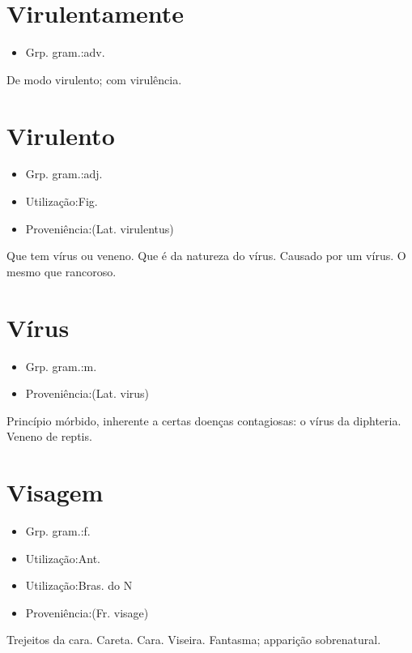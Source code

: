 \documentclass{article}
\begin{document}
\section{Virulentamente}
\begin{itemize}
\item {Grp. gram.:adv.}
\end{itemize}
De modo virulento; com virulência.
\section{Virulento}
\begin{itemize}
\item {Grp. gram.:adj.}
\end{itemize}
\begin{itemize}
\item {Utilização:Fig.}
\end{itemize}
\begin{itemize}
\item {Proveniência:(Lat. \textunderscore virulentus\textunderscore )}
\end{itemize}
Que tem vírus ou veneno.
Que é da natureza do vírus.
Causado por um vírus.
O mesmo que \textunderscore rancoroso\textunderscore .
\section{Vírus}
\begin{itemize}
\item {Grp. gram.:m.}
\end{itemize}
\begin{itemize}
\item {Proveniência:(Lat. \textunderscore virus\textunderscore )}
\end{itemize}
Princípio mórbido, inherente a certas doenças contagiosas: \textunderscore o vírus da diphteria\textunderscore .
Veneno de reptis.
\section{Visagem}
\begin{itemize}
\item {Grp. gram.:f.}
\end{itemize}
\begin{itemize}
\item {Utilização:Ant.}
\end{itemize}
\begin{itemize}
\item {Utilização:Bras. do N}
\end{itemize}
\begin{itemize}
\item {Proveniência:(Fr. \textunderscore visage\textunderscore )}
\end{itemize}
Trejeitos da cara.
Careta.
Cara.
Viseira.
Fantasma; apparição sobrenatural.
\end{document}

